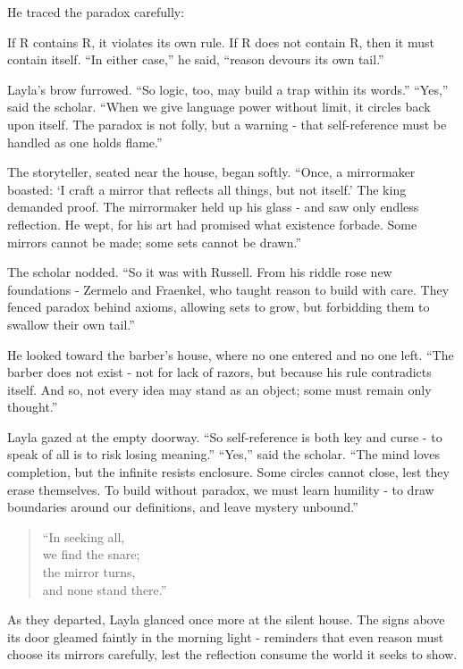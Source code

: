 \documentclass[
  letterpaper,
  DIV=11,
  numbers=noendperiod]{scrreprt}
\begin{document}
He traced the paradox carefully:

If R contains R, it violates its own rule. If R does not contain R, then
it must contain itself. ``In either case,'' he said, ``reason devours
its own tail.''

Layla's brow furrowed. ``So logic, too, may build a trap within its
words.'' ``Yes,'' said the scholar. ``When we give language power
without limit, it circles back upon itself. The paradox is not folly,
but a warning - that self-reference must be handled as one holds
flame.''

The storyteller, seated near the house, began softly. ``Once, a
mirrormaker boasted: `I craft a mirror that reflects all things, but not
itself.' The king demanded proof. The mirrormaker held up his glass -
and saw only endless reflection. He wept, for his art had promised what
existence forbade. Some mirrors cannot be made; some sets cannot be
drawn.''

The scholar nodded. ``So it was with Russell. From his riddle rose new
foundations - Zermelo and Fraenkel, who taught reason to build with
care. They fenced paradox behind axioms, allowing sets to grow, but
forbidding them to swallow their own tail.''

He looked toward the barber's house, where no one entered and no one
left. ``The barber does not exist - not for lack of razors, but because
his rule contradicts itself. And so, not every idea may stand as an
object; some must remain only thought.''

Layla gazed at the empty doorway. ``So self-reference is both key and
curse - to speak of all is to risk losing meaning.'' ``Yes,'' said the
scholar. ``The mind loves completion, but the infinite resists
enclosure. Some circles cannot close, lest they erase themselves. To
build without paradox, we must learn humility - to draw boundaries
around our definitions, and leave mystery unbound.''

\begin{quote}
``In seeking all,\\
we find the snare;\\
the mirror turns,\\
and none stand there.''
\end{quote}

As they departed, Layla glanced once more at the silent house. The signs
above its door gleamed faintly in the morning light - reminders that
even reason must choose its mirrors carefully, lest the reflection
consume the world it seeks to show.
\end{document}
